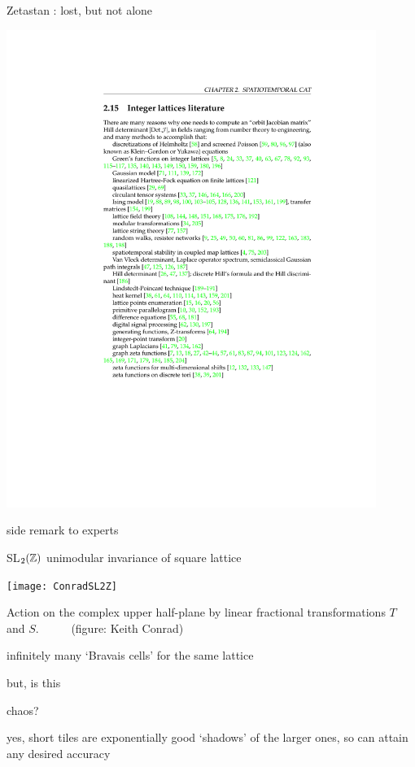 \begin{frame}{Zetastan : lost, but not alone}
\begin{center}
\hfill\includegraphics[width=0.90\textwidth]{lattLitClip2}
\end{center}
\end{frame} %

\begin{frame}{side remark to experts}
    \begin{block}{SL$_2(\mathbb{Z})$ unimodular invariance of square lattice}
\begin{center}
  \texttt{[image: ConradSL2Z]}
\end{center}
Action on the complex upper half-plane by linear
fractional transformations $T$ and $S$.
~~~~~(figure: Keith Conrad)
    \end{block}
\bigskip

infinitely many `Bravais cells' for the same lattice
\end{frame} %

\begin{frame}{but, is this}
\vfill
\begin{center}
{\huge chaos?}
\end{center}
\vfill
yes, short tiles are exponentially good `shadows' of the larger ones,
so can attain any desired accuracy
\end{frame} %

